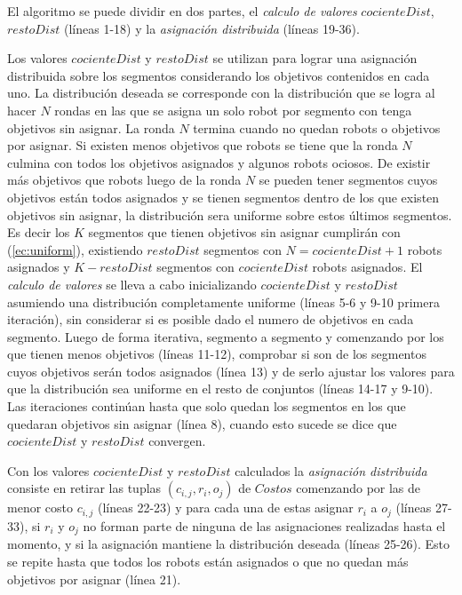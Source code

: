 \begin{permissive}
El algoritmo se puede dividir en dos partes, el \emph{calculo de valores}
$cocienteDist$, $restoDist$ (líneas 1-18) y la \emph{asignación distribuida} (líneas
19-36). 
\end{permissive}

Los valores $cocienteDist$ y $restoDist$ se utilizan para lograr una asignación
distribuida sobre los segmentos considerando los objetivos contenidos en cada
uno. La distribución deseada se corresponde con la distribución que se logra al
hacer $N$ rondas en las que se asigna un solo robot por segmento con tenga
objetivos sin asignar. La ronda $N$ termina cuando no quedan robots o objetivos
por asignar. Si existen menos objetivos que robots se tiene que la ronda $N$
culmina con todos los objetivos asignados y algunos robots ociosos. De existir
más objetivos que robots luego de la ronda $N$ se pueden tener segmentos cuyos
objetivos están todos asignados y se tienen segmentos dentro de los que 
existen objetivos sin asignar, la distribución sera uniforme sobre estos últimos
segmentos. Es decir los $K$ segmentos que tienen objetivos sin asignar
cumplirán con (\ref{ec:uniform}), existiendo $restoDist$ segmentos con
$N=cocienteDist+1$ robots asignados y $K-restoDist$ segmentos con
$cocienteDist$ robots asignados. El \emph{calculo de valores} se lleva a cabo
inicializando $cocienteDist$ y $restoDist$ asumiendo una distribución
completamente uniforme (líneas 5-6 y 9-10 primera iteración), sin considerar si
es posible dado el numero de objetivos en cada segmento. Luego de forma
iterativa, segmento a segmento y comenzando por los que tienen menos objetivos
(líneas 11-12), comprobar si son de los segmentos cuyos objetivos serán todos
asignados (línea 13) y de serlo ajustar los valores para que la distribución
sea uniforme en el resto de conjuntos (líneas 14-17 y 9-10). Las iteraciones
continúan hasta que solo quedan los segmentos en los que quedaran objetivos sin
asignar (línea 8), cuando esto sucede se dice que $cocienteDist$ y $restoDist$
convergen.

Con los valores $cocienteDist$ y $restoDist$ calculados la \emph{asignación
distribuida} consiste en retirar las tuplas $(c_{i,j},r_i,o_j)$ de $Costos$
comenzando por las de menor costo $c_{i,j}$ (líneas 22-23) y para cada una de
estas asignar $r_i$ a $o_j$ (líneas 27-33), si $r_i$ y $o_j$ no forman parte de
ninguna de las asignaciones realizadas hasta el momento, y si la asignación
mantiene la distribución deseada (líneas 25-26). Esto se repite hasta que
todos los robots están asignados o que no quedan más objetivos por asignar
(línea 21).

